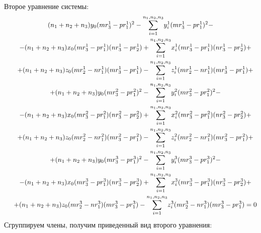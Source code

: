 Второе уравнение системы:
$$\begin{gathered}
	(n_1 + n_2 + n_3) y_0 (m r_3^1 - p r_1^1)^2 - \underset{i=1}{\overset{n_1, n_2, n_3}{\sum}} y_i^1 (m r_3^1 - p r_1^1)^2 - \\
	\hspace{0.5cm} - (n_1 + n_2 + n_3) x_0 (m r_3^1 - p r_1^1) (n r_3^1 - p r_2^1) + \underset{i=1}{\overset{n_1, n_2, n_3}{\sum}} x_i^1 (m r_3^1 - p r_1^1) (n r_3^1 - p r_2^1) + \\
	\hspace{0.5cm} + (n_1 + n_2 + n_3) z_0 (m r_2^1 - n r_1^1) (m r_3^1 - p r_1^1) - \underset{i=1}{\overset{n_1, n_2, n_3}{\sum}} z_i^1  (m r_2^1 - n r_1^1) (m r_3^1 - p r_1^1) + \\
	\hspace{0.5cm} + (n_1 + n_2 + n_3) y_0 (m r_3^2 - p r_1^2)^2 - \underset{i=1}{\overset{n_1, n_2, n_3}{\sum}} y_i^2 (m r_3^2 - p r_1^2)^2 - \\
	\hspace{0.5cm} - (n_1 + n_2 + n_3) x_0 (m r_3^2 - p r_1^2) (n r_3^2 - p r_2^2) + \underset{i=1}{\overset{n_1, n_2, n_3}{\sum}} x_i^2  (m r_3^2 - p r_1^2) (n r_3^2 - p r_2^2) + \\
	\hspace{0.5cm} + (n_1 + n_2 + n_3) z_0 (m r_2^2 - n r_1^2) (m r_3^2 - p r_1^2) - \underset{i=1}{\overset{n_1, n_2, n_3}{\sum}} z_i^2 (m r_2^2 - n r_1^2) (m r_3^2 - p r_1^2) + \\
	\hspace{0.5cm} + (n_1 + n_2 + n_3) y_0 (m r_3^3 - p r_1^3)^2 - \underset{i=1}{\overset{n_1, n_2, n_3}{\sum}} y_i^3 (m r_3^3 - p r_1^3)^2 - \\
	\hspace{0.5cm} - (n_1 + n_2 + n_3) x_0 (m r_3^3 - p r_1^3) (n r_3^3 - p r_2^3) + \underset{i=1}{\overset{n_1, n_2, n_3}{\sum}} x_i^3 (m r_3^3 - p r_1^3) (n r_3^3 - p r_2^3) + \\
	\hspace{0.5cm} + (n_1 + n_2 + n_3) z_0 (m r_2^3 - n r_1^3) (m r_3^3 - p r_1^3) - \underset{i=1}{\overset{n_1, n_2, n_3}{\sum}} z_i^3 (m r_2^3 - n r_1^3) (m r_3^3 - p r_1^3) = 0
\end{gathered}$$
Сгруппируем члены, получим приведенный вид второго уравнения:
